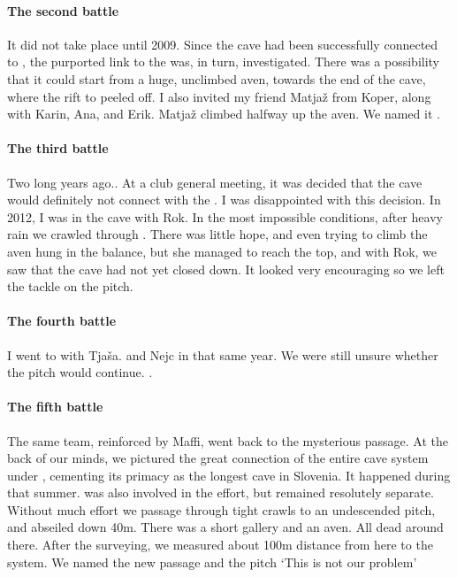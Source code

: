 \paragraph{The second battle} It did not take place until 2009. Since the cave had been successfully connected to , the purported link to the  was, in turn, investigated. There was a possibility that it could start from a huge, unclimbed aven, towards the end of the cave, where the rift to  peeled off. I also invited my friend Matjaž from Koper, along with Karin, Ana, and Erik. Matjaž climbed halfway up the aven. We named it .


\paragraph {The third battle} Two long years ago.. At a club general meeting, it was decided that the cave would definitely not connect with the .  I was disappointed with this decision. In 2012, I was in the cave with Rok.  In the most impossible conditions, after heavy rain we crawled through . There was little hope, and even trying to climb the aven hung in the balance, but she managed to reach the top, and with Rok, we saw that the cave had not yet closed down. It looked very encouraging so we left the tackle on the pitch.


 \paragraph {The fourth battle} I went to  with Tja{\v{s}}a. and Nejc in that same year. We were still unsure whether the pitch would continue. .


\paragraph{The fifth battle}  The same team, reinforced by Maffi, went back to the mysterious passage. At the back of our minds, we pictured the great connection of the entire cave system under , cementing its primacy as the longest cave in Slovenia. It happened during that summer.  was also involved in the effort, but remained resolutely separate. Without much effort we passage through tight crawls to an undescended pitch, and abseiled down 40m. There was a short gallery and an aven. All dead around there. After the surveying, we measured about 100m distance from here to the system. We named the new passage and the pitch `This is not our problem' 

